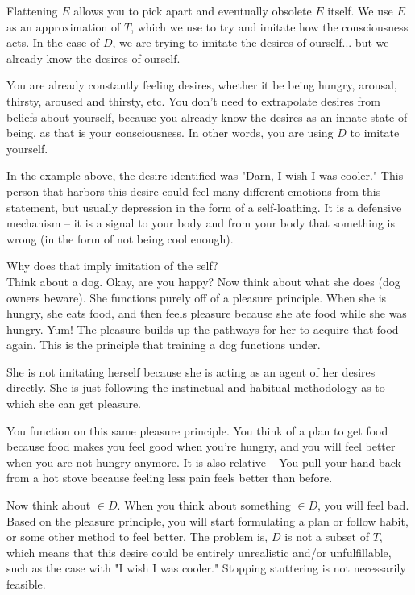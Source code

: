 \documentclass{article}
\begin{document}
Flattening $E$ allows you to pick apart and eventually obsolete $E$ itself. We
use $E$ as an approximation of $T$, which we use to try and imitate how the
consciousness acts. In the case of $D$, we are trying to imitate the desires of
ourself... but we already know the desires of ourself.

You are already constantly feeling desires, whether it be being hungry, arousal,
thirsty, aroused and thirsty, etc. You don't need to extrapolate desires from
beliefs about yourself, because you already know the desires as an innate state
of being, as that is your consciousness. In other words, you are using $D$ to
imitate yourself.

In the example above, the desire identified was "Darn, I wish I was cooler."
This person that harbors this desire could feel many different emotions from
this statement, but usually depression in the form of a self-loathing. It is a
defensive mechanism -- it is a signal to your body and from your body that
something is wrong (in the form of not being cool enough).

Why does that imply imitation of the self? \\

\noindent Think about a dog. Okay, are you happy? Now think about what she does
(dog owners beware). She functions purely off of a pleasure principle. When she
is hungry, she eats food, and then feels pleasure because she ate food while she
was hungry. Yum! The pleasure builds up the pathways for her to acquire that food
again. This is the principle that training a dog functions under.

She is not imitating herself because she is acting as an agent of her desires
directly. She is just following the instinctual and habitual methodology as to
which she can get pleasure.

You function on this same pleasure principle. You think of a plan to get food
because food makes you feel good when you're hungry, and you will feel better
when you are not hungry anymore. It is also relative -- You pull your hand back
from a hot stove because feeling less pain feels better than before.

Now think about $\in D$. When you think about something $\in D$, you will feel
bad. Based on the pleasure principle, you will start formulating a plan or
follow habit, or some other method to feel better. The problem is, $D$ is not a
subset of $T$, which means that this desire could be entirely unrealistic and/or
unfulfillable, such as the case with "I wish I was cooler." Stopping stuttering
is not necessarily feasible.
\end{document}
